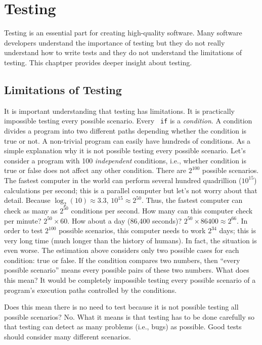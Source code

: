 \chapter{Testing}

Testing is an essential part for creating high-quality software.  Many
software developers understand the importance of testing but they do
not really understand how to write tests and they do not understand
the limitations of testing. This chaptper provides deeper insight
about testing.

\section{Limitations of Testing}

It is important understanding that testing has limitations.  It is
practically impossible testing every possible scenario.  Every {\tt
  if} is a {\it condition}. A condition divides a program into two
different paths depending whether the condition is true or not.  A
non-trivial program can easily have hundreds of conditions.  As a
simple explanation why it is not possible testing every possible
scenario. Let's consider a program with 100 {\it independent}
conditions, i.e., whether condition is true or false does not affect
any other condition.  There are $2^{100}$ possible scenarios.  The
fastest computer in the world can perform several hundred quadrillion
($10^{15}$) calculations per second; this is a parallel computer but
let's not worry about that detail.  Because $\log_2(10) \approx 3.3$,
$10^{15} \approx 2 ^ {50}$. Thus, the fastest computer can check as
many as $2 ^ {50}$ conditions per second. How many can this computer
check per minute? $2 ^ {50} \times 60$. How about a day (86,400
seconds)?  $2 ^ {50} \times 86400 \approx 2 ^ {66}$.  In order to test
$2^{100}$ possible scenarios, this computer needs to work $2^{34}$
days; this is very long time (much longer than the history of humans).
In fact, the situation is even worse.  The estimation above considers
only two possible cases for each condition: true or false. If the
condition compares two numbers, then ``every possible scenario'' means
every possible pairs of these two numbers.  What does this mean? It
would be completely impossible testing every possible scenario of a
program's execution paths controlled by the conditions.

Does this mean there is no need to test because it is not possible
testing all possible scenarios? No. What it means is that testing has to
be done carefully so that testing can detect as many problems (i.e.,
bugs) as possible.  Good tests should consider many different scenarios.

